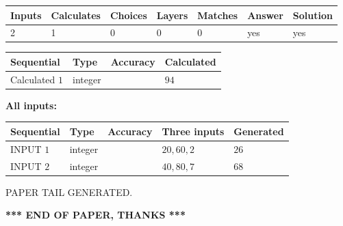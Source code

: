 \documentclass[12pt]{article}
\begin{document}
 

 
   
   
   
   
\noindent\begin{tabular}{|l|l|l|l|l|l|l|}
 \hline
Inputs & Calculates & Choices & Layers & Matches & Answer & Solution \\ \hline
 2  & 
 1  & 
 0
  & 
 0  & 
 0  & 
  yes & 
  yes 
  \\ \hline
 \end{tabular}
   
   
   
   
\noindent{}
   
   
  
  
\noindent\begin{tabular}{|l|l|l|l|}
\hline
 Sequential & Type & Accuracy & Calculated \\ 
\hline
 
 
  Calculated $  1 $ & integer &  & 
  $ 94 $ 
 \\  \hline  
 \end{tabular}
   
   
   
   
\noindent\vspace{0.1in}\hspace{-0.08in} {\textbf{\Large{All inputs: }}}
   
   
  
  
\noindent\begin{tabular}{|l|l|l|l|l|}
\hline
 Sequential & Type & Accuracy & Three inputs & Generated \\ 
\hline
 
 
  INPUT $  1 $ & integer &  & $
 20
 , 
 60
 , 
 2
 $ & $ 26 $ 
 \\  \hline  
 
 
  INPUT $  2 $ & integer &  & $
 40
 , 
 80
 , 
 7
 $ & $ 68 $ 
 \\  \hline  
 \end{tabular}
   
   
   
   
   
   
 \vspace{0.2in}
 
   
   
\vspace{2.0in} PAPER TAIL GENERATED.
   
   
   
   
\vspace{1.0in} 
{\textbf{\large{ *** END OF PAPER, THANKS *** }}} 
   
\end{document}

